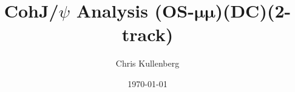 \title{CohJ/$\psi$ Analysis (\textbf{OS}-$\boldsymbol{\mu\mu}$)(\textbf{DC})(\textbf{2-track})}
\author{Chris Kullenberg}
\date{\today}
